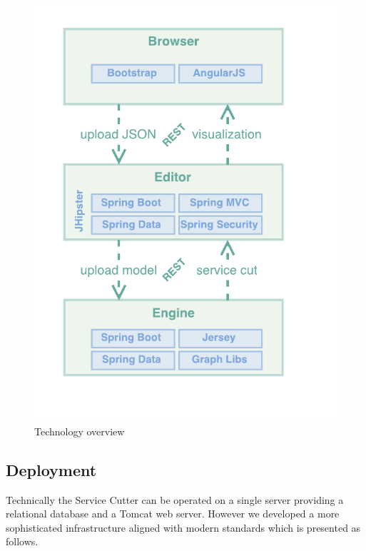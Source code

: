 \begin{minipage}[t]{0.5\textwidth}
	\begin{figure}[H]
		\includegraphics[scale=1]{diagrams/Technologies.pdf}
		\caption{Technology overview}
		\label{fig:technologies}
	\end{figure}
\end{minipage}


\subsection{Deployment}
\label{subsec:infrastructure}

Technically the Service Cutter can be operated on a single server providing a relational database and a Tomcat web server. However we developed a more sophisticated infrastructure aligned with modern standards which is presented as follows.

